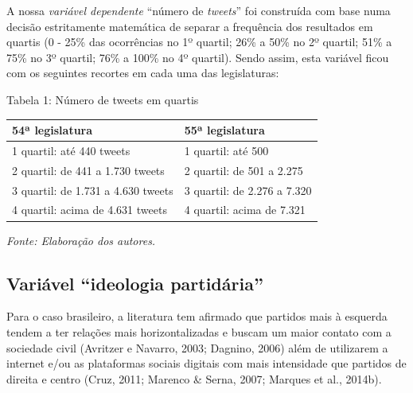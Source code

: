 A nossa \emph{variável dependente} ``número de \emph{tweets}'' foi
construída com base numa decisão estritamente matemática de separar a
frequência dos resultados em quartis (0 - 25\% das ocorrências no 1º
quartil; 26\% a 50\% no 2º quartil; 51\% a 75\% no 3º quartil; 76\% a
100\% no 4º quartil). Sendo assim, esta variável ficou com os seguintes
recortes em cada uma das legislaturas:

\begin{center}
Tabela 1: Número de tweets em quartis
\end{center}

\begin{center}
\centering
\begin{tabular}{|l|l|}
\hline
\textbf{54ª legislatura} & \textbf{55ª legislatura} \\ \hline
1 quartil: até 440 tweets & 1 quartil: até 500 \\ \hline
2 quartil: de 441 a 1.730 tweets & 2 quartil: de 501 a 2.275 \\ \hline
3 quartil: de 1.731 a 4.630 tweets & 3 quartil: de 2.276 a 7.320 \\ \hline
4 quartil: acima de 4.631 tweets & 4 quartil: acima de 7.321 \\ \hline
\end{tabular}
\end{center}

\begin{center}
{\footnotesize\emph{Fonte: Elaboração dos autores.}}
\end{center}

\subsection{Variável ``ideologia partidária''}

Para o caso brasileiro, a literatura tem afirmado que partidos mais à
esquerda tendem a ter relações mais horizontalizadas e buscam um maior
contato com a sociedade civil (Avritzer e Navarro, 2003; Dagnino, 2006)
além de utilizarem a internet e/ou as plataformas sociais digitais com
mais intensidade que partidos de direita e centro (Cruz, 2011; Marenco
\& Serna, 2007; Marques et al., 2014b).


